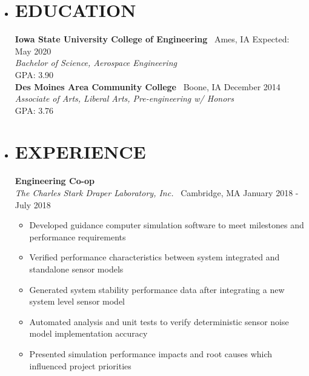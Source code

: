 \documentclass[overlapped, 11pt]{res}
\begin{document}
\address
{
    4329 Lincoln Swing \#36 Ames, IA 50014 
    \textbar \ (641) 780-9473 
    \textbar \ carldevries@gmail.com 
    \textbar \ www.carldevries.com
}

\begin{resume}

    \begin{itemize}
    \item[]\section{EDUCATION}
        \textbf{Iowa State University College of Engineering} \textbar 
            \ Ames, IA \hfill Expected: May 2020\\
        \emph{Bachelor of Science, Aerospace Engineering} \\
            GPA: 3.90
        \\[0.5em]
        \textbf{Des Moines Area Community College} \textbar 
            \ Boone, IA \hfill December 2014\\
        \emph{Associate of Arts, Liberal Arts, Pre-engineering w/ Honors}\\
            GPA: 3.76

    \item[]\section{EXPERIENCE}

        \textbf{Engineering Co-op}\\
        \emph{The Charles Stark Draper Laboratory, Inc.} \textbar 
            \ Cambridge, MA \hfill January 2018 - July 2018
        \begin{itemize}
            \item Developed guidance computer simulation software to meet 
                milestones and performance requirements
            \item Verified performance characteristics between system 
                integrated and standalone sensor models
            \item Generated system stability performance data after 
                integrating a new system level sensor model
            \item Automated analysis and unit tests to verify deterministic
                sensor noise model implementation accuracy
            \item Presented simulation performance impacts and root causes
                  which influenced project priorities
        \end{itemize}


\end{itemize}
\end{resume}
\end{document}
